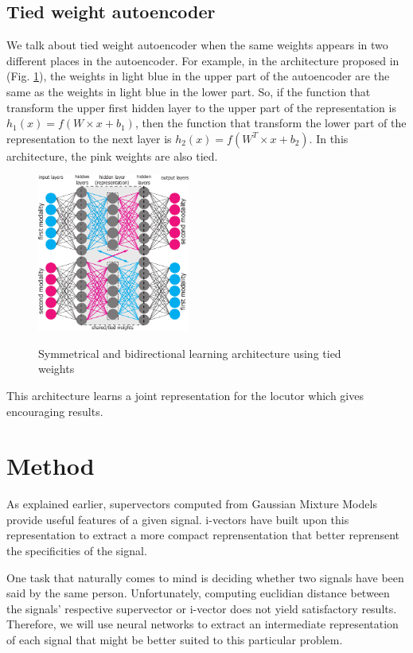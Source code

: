 \documentclass[conference]{IEEEtran}
\begin{document}
\subsection{Tied weight autoencoder}


We talk about tied weight autoencoder when the same weights appears in two different places in the autoencoder. For example, in the architecture proposed in \cite{vukotic:hal-01314302}
(Fig. \ref{archi_vedran}), the weights in light blue in the upper part of the autoencoder are the same as the weights in light blue in the lower part. So, if the function that transform the upper first hidden layer to the upper part of the representation is $h_1(x) = f(W \times x + b_1)$, then  the function that transform the lower part of the representation to the next layer is $h_2(x) = f(W^T \times x + b_2)$. In this architecture, the pink weights are also tied. 

\begin{figure}[!h]
    \centering
    \caption{Symmetrical and bidirectional learning architecture using tied weights}
    \includegraphics[width=5cm]{archi-vedran.pdf}
    \label{archi_vedran}
\end{figure}

This architecture learns a joint representation for the locutor which gives encouraging results.

\section{Method}

As explained earlier, supervectors computed from Gaussian Mixture Models provide
useful features of a given signal. i-vectors have built upon this representation
to extract a more compact reprensentation that better reprensent the
specificities of the signal.

One task that naturally comes to mind is deciding whether two signals have been
said by the same person. Unfortunately, computing euclidian distance between the signals'
respective supervector or i-vector does not yield satisfactory results.
Therefore, we will use neural networks to extract an intermediate representation
of each signal that might be better suited to this particular problem.
\end{document}
